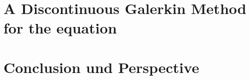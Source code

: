 \documentclass{template}
\begin{document}
\chapter{A Discontinuous Galerkin Method for the \MA equation}
\label{chapter:ourMethod}


\chapter{Conclusion und Perspective}
\label{ch:conclusion}


\newpage
%
\newpage


\end{document}
